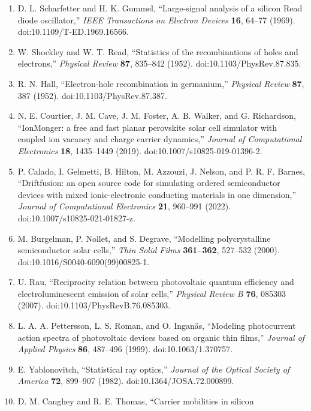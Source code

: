 \documentclass[
  11pt,
  american,
]{report}
\providecommand{\tightlist}{%
  \setlength{\itemsep}{0pt}\setlength{\parskip}{0pt}}
\begin{document}
\begin{enumerate}
\def\labelenumi{\arabic{enumi}.}
\tightlist
\item
  D. L. Scharfetter and H. K. Gummel, ``Large-signal analysis of a
  silicon Read diode oscillator,'' \emph{IEEE Transactions on Electron
  Devices} \textbf{16}, 64--77 (1969). doi:10.1109/T-ED.1969.16566.
\item
  W. Shockley and W. T. Read, ``Statistics of the recombinations of
  holes and electrons,'' \emph{Physical Review} \textbf{87}, 835--842
  (1952). doi:10.1103/PhysRev.87.835.
\item
  R. N. Hall, ``Electron-hole recombination in germanium,''
  \emph{Physical Review} \textbf{87}, 387 (1952).
  doi:10.1103/PhysRev.87.387.
\item
  N. E. Courtier, J. M. Cave, J. M. Foster, A. B. Walker, and G.
  Richardson, ``IonMonger: a free and fast planar perovskite solar cell
  simulator with coupled ion vacancy and charge carrier dynamics,''
  \emph{Journal of Computational Electronics} \textbf{18}, 1435--1449
  (2019). doi:10.1007/s10825-019-01396-2.
\item
  P. Calado, I. Gelmetti, B. Hilton, M. Azzouzi, J. Nelson, and P. R. F.
  Barnes, ``Driftfusion: an open source code for simulating ordered
  semiconductor devices with mixed ionic-electronic conducting materials
  in one dimension,'' \emph{Journal of Computational Electronics}
  \textbf{21}, 960--991 (2022). doi:10.1007/s10825-021-01827-z.
\item
  M. Burgelman, P. Nollet, and S. Degrave, ``Modelling polycrystalline
  semiconductor solar cells,'' \emph{Thin Solid Films}
  \textbf{361--362}, 527--532 (2000). doi:10.1016/S0040-6090(99)00825-1.
\item
  U. Rau, ``Reciprocity relation between photovoltaic quantum efficiency
  and electroluminescent emission of solar cells,'' \emph{Physical
  Review B} \textbf{76}, 085303 (2007). doi:10.1103/PhysRevB.76.085303.
\item
  L. A. A. Pettersson, L. S. Roman, and O. Inganäs, ``Modeling
  photocurrent action spectra of photovoltaic devices based on organic
  thin films,'' \emph{Journal of Applied Physics} \textbf{86}, 487--496
  (1999). doi:10.1063/1.370757.
\item
  E. Yablonovitch, ``Statistical ray optics,'' \emph{Journal of the
  Optical Society of America} \textbf{72}, 899--907 (1982).
  doi:10.1364/JOSA.72.000899.
\item
  D. M. Caughey and R. E. Thomas, ``Carrier mobilities in silicon

\end{enumerate}
\end{document}
